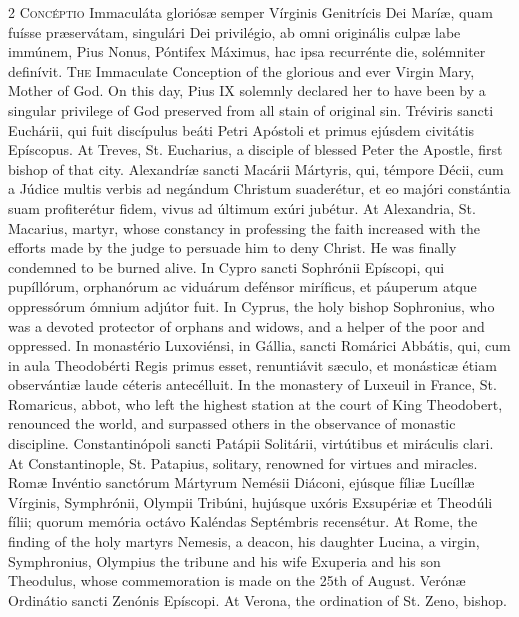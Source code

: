 \begin{paracol}{2}
\lettrine[lines=2]{C}{oncéptio} Immaculáta gloriósæ semper Vírginis Genitrícis Dei Maríæ, quam fuísse 
 præservátam, singulári Dei privilégio, ab omni originális culpæ labe immúnem, 
 Pius Nonus, Póntifex Máximus, hac ipsa recurrénte die, solémniter definívit.
\switchcolumn
{}
\lettrine[lines=2]{T}{he} Immaculate 
 Conception of the glorious and ever Virgin Mary, Mother of God. On 
 this day, Pius IX solemnly declared her to have been by a singular privilege 
 of God preserved from all stain of original sin.
\switchcolumn*
{}
Tréviris sancti 
 Euchárii, qui fuit discípulus beáti Petri Apóstoli et primus ejúsdem 
 civitátis Epíscopus.
\switchcolumn
{}
At Treves, St. Eucharius, a disciple 
 of blessed Peter the Apostle, first bishop of that city.
\switchcolumn*
{}
Alexandríæ sancti 
 Macárii Mártyris, qui, témpore Décii, cum a Júdice multis verbis ad negándum 
 Christum suaderétur, et eo majóri constántia suam profiterétur fidem, vivus 
 ad últimum exúri jubétur.
\switchcolumn
{}
At Alexandria, St. Macarius, martyr, 
 whose constancy in professing the faith increased with the efforts made by 
 the judge to persuade him to deny Christ. He was finally condemned to 
 be burned alive.
\switchcolumn*
{}
In Cypro sancti 
 Sophrónii Epíscopi, qui pupíllórum, orphanórum ac viduárum defénsor 
 miríficus, et páuperum atque oppressórum ómnium adjútor fuit.
\switchcolumn
{}
In Cyprus, the holy bishop 
 Sophronius, who was a devoted protector of orphans and widows, and a helper 
 of the poor and oppressed.
\switchcolumn*
{}
In monastério 
 Luxoviénsi, in Gállia, sancti Romárici Abbátis, qui, cum in aula Theodobérti 
 Regis primus esset, renuntiávit sæculo, et monásticæ étiam observántiæ laude 
 céteris antecélluit.
\switchcolumn
{}
In the monastery of Luxeuil in 
 France, St. Romaricus, abbot, who left the highest station at the court of 
 King Theodobert, renounced the world, and surpassed others in the observance 
 of monastic discipline.
\switchcolumn*
{}
Constantinópoli sancti 
 Patápii Solitárii, virtútibus et miráculis clari.
\switchcolumn
{}
At Constantinople, St. Patapius, 
 solitary, renowned for virtues and miracles.
\switchcolumn*
{}
Romæ Invéntio sanctórum 
 Mártyrum Nemésii Diáconi, ejúsque fíliæ Lucíllæ Vírginis, Symphrónii, 
 Olympii Tribúni, hujúsque uxóris Exsupériæ et Theodúli fílii; quorum memória 
 octávo Kaléndas Septémbris recensétur.
\switchcolumn
{}
At Rome, the finding of the holy 
 martyrs Nemesis, a deacon, his daughter Lucina, a virgin, Symphronius, 
 Olympius the tribune and his wife Exuperia and his son Theodulus, whose 
 commemoration is made on the 25th of August.
\switchcolumn*
{}
Verónæ Ordinátio sancti 
 Zenónis Epíscopi.
\switchcolumn
{}
At Verona, the ordination of St. 
 Zeno, bishop.
\switchcolumn*
{}
\end{paracol}



